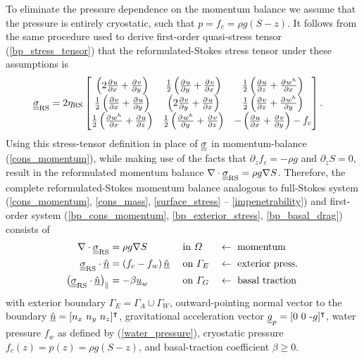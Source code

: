 To eliminate the pressure dependence on the momentum balance we assume that the pressure is entirely cryostatic, such that $p = f_c = \rho g (S - z)$.  It follows from the same procedure used to derive first-order quasi-stress tensor (\ref{bp_stress_tensor}) that the reformulated-Stokes stress tensor under these assumptions is 
{\footnotesize
\begin{align}
  \label{rs_stress_tensor}
  \underline{\underline{\sigma}}_{\text{RS}} &=
  2 \eta_{\text{RS}} 
  \begin{bmatrix}
       \left( 2\frac{\partial^{} u}{\partial x^{} } + \frac{\partial^{} v}{\partial y^{} } \right) & \frac{1}{2}\left( \frac{\partial^{} u}{\partial y^{} } + \frac{\partial^{} v}{\partial x^{} } \right) & \frac{1}{2} \left( \frac{\partial^{} u}{\partial z^{} } + \frac{\partial^{} w^h}{\partial x^{} } \right) \\
       \frac{1}{2}\left( \frac{\partial^{} v}{\partial x^{} } + \frac{\partial^{} u}{\partial y^{} } \right) & \left( 2\frac{\partial^{} v}{\partial y^{} } + \frac{\partial^{} u}{\partial x^{} } \right) & \frac{1}{2} \left( \frac{\partial^{} v}{\partial z^{} } + \frac{\partial^{} w^h}{\partial y^{} } \right) \\
       \frac{1}{2}\left( \frac{\partial^{} w^h}{\partial x^{} } + \frac{\partial^{} u}{\partial z^{} } \right) & \frac{1}{2}\left( \frac{\partial^{} w^h}{\partial y^{} } + \frac{\partial^{} v}{\partial z^{} } \right) & -\left( \frac{\partial^{} u}{\partial x^{} } + \frac{\partial^{} v}{\partial y^{} } \right) - f_c
     \end{bmatrix}.
\end{align}}
Using this stress-tensor definition in place of $\underline{\underline{\sigma}}$ in momentum-balance (\ref{cons_momentum}), while making use of the facts that $\partial_z f_c = -\rho g$ and $\partial_z S = 0$, result in the reformulated momentum balance $\nabla \cdot \underline{\underline{\sigma}}_{\text{RS}} = \rho g \nabla S$.  Therefore, the complete reformulated-Stokes momentum balance analogous to full-Stokes system (\ref{cons_momentum}, \ref{cons_mass}, \ref{surface_stress} -- \ref{impenetrability}) and first-order system (\ref{bp_cons_momentum}, \ref{bp_exterior_stress}, \ref{bp_basal_drag}) consists of
{\small
\begin{align}
  \label{rs_cons_momentum}
  \nabla \cdot \underline{\underline{\sigma}}_{\text{RS}} &= \rho g \nabla S &&\text{ in } \varOmega &&\leftarrow \text{ momentum} \\
  \label{rs_exterior_stress}
  \underline{\underline{\sigma}}_{\text{RS}} \cdot \underline{\hat{n}} &= \left(f_c - f_w \right) \underline{\hat{n}} &&\text{ on } \varGamma_E &&\leftarrow \text{ exterior press.} \\
  \label{rs_basal_drag}
  \big( \underline{\underline{\sigma}}_{\text{RS}} \cdot \underline{\hat{n}} \big)_{\Vert} &= -\beta \underline{u}_w &&\text{ on } \varGamma_G &&\leftarrow \text{ basal traction }
\end{align}}
with exterior boundary $\Gamma_E = \Gamma_A \cup \Gamma_W$, outward-pointing normal vector to the boundary $\underline{\hat{n}} = [n_x\ n_y\ n_z]^\intercal$, gravitational acceleration vector $\underline{g}_p = [0\ 0\ \text{-}g]^\intercal$, water pressure $f_w$ as defined by (\ref{water_pressure}), cryostatic pressure  $f_c(z) = p(z) = \rho g (S - z)$, and basal-traction coefficient $\beta \geq 0$.

